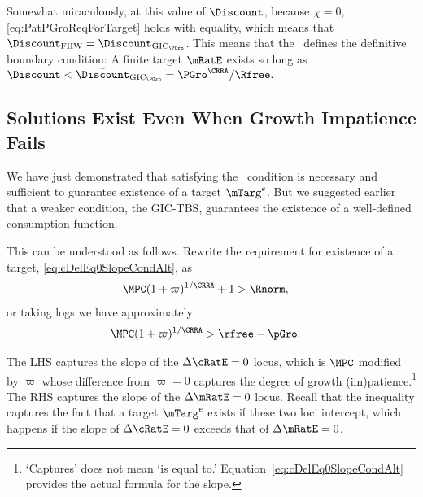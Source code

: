 \documentclass{\handout}
\begin{document}
Somewhat miraculously, at this value of $\Discount$, because $\chi=0$, \eqref{eq:PatPGroReqForTarget} holds with equality, which means that $\DiscountMaxGICWhenFHWCTBSHolds=\DiscountMaxGICPGro$.  This means that the \GICPGro~defines the definitive boundary condition:  A finite target $\mRatE$ exists so long as $\Discount < \DiscountMaxGICPGro = \PGro^{\CRRA}/\Rfree.$

\subsection{Solutions Exist Even When Growth Impatience Fails}

We have just demonstrated that satisfying the \GICPGro~condition is necessary and sufficient to guarantee existence of a target $\mTarg^{e}$.  But we suggested earlier that a weaker condition, the GIC-TBS, guarantees the existence of a well-defined consumption function.

This can be understood as follows.  Rewrite the requirement for existence of a target, \eqref{eq:cDelEq0SlopeCondAlt}, as 
\begin{equation}\begin{gathered}\begin{aligned}
  \MPCU (1+\varpi)^{1/\CRRA}+1 & >   \Rnorm  \label{eq:cDelEq0SlopeCondAltAlt}
,\end{aligned}\end{gathered}\end{equation}
or taking logs we have approximately 
\begin{equation}\begin{gathered}\begin{aligned}
  \MPCU (1+\varpi)^{1/\CRRA} & >   \rfree-\pGro \label{eq:cDelEq0SlopeCondLog}
.\end{aligned}\end{gathered}\end{equation}

The LHS captures the slope of the $\dcEqZero$ locus, which is $\MPCU$ modified by $\varpi$ whose difference from $\varpi=0$ captures the degree of growth (im)patience.\footnote{`Captures' does not mean `is equal to.'  Equation~\eqref{eq:cDelEq0SlopeCondAlt} provides the actual formula for the slope.}  The RHS captures the slope of the $\dmEqZero$ locus.  Recall that the inequality captures the fact that a target $\mTarg^{e}$ exists if these two loci intercept, which happens if the slope of $\dcEqZero$ exceeds that of $\dmEqZero$.
\end{document}

